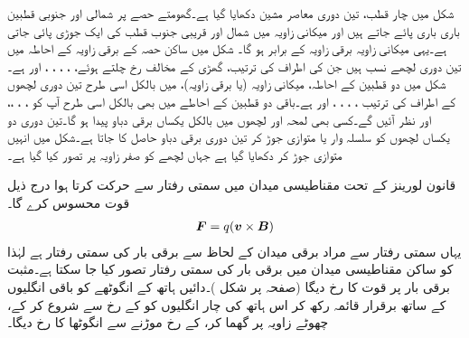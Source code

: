 شکل  میں چار قطب، تین دوری معاصر مشین دکھایا گیا ہے۔گھومتے حصے پر شمالی اور جنوبی قطبین باری باری پائے جاتے ہیں اور  میکانی زاویہ میں شمال اور قریبی جنوب قطب کی ایک  جوڑی  پائی جاتی ہے۔یہی میکانی زاویہ   برقی زاویہ کے برابر ہو گا۔ شکل  میں ساکن حصہ کے  برقی زاویہ کے احاطہ میں تین دوری لچھے نسب  ہیں  جن کی اطراف کی ترتیب، گھڑی کے مخالف رخ چلتے ہوئے،   ، ، ، ،  اور  ہے۔شکل  میں  دو قطبین کے احاطہ،  میکانی زاویہ (یا  برقی زاویہ)، میں بالکل اسی طرح تین دوری لچھوں کے اطراف کی ترتیب   ، ، ، ،  اور  ہے۔باقی دو قطبین کے احاطے میں بھی بالکل اسی طرح آپ کو ، ، ،،  اور  نظر آئیں گے۔کسی بھی لمحہ  اور  لچھوں میں بالکل یکساں برقی دباو پیدا ہو گا۔تین  دوری دو یکساں لچھوں کو سلسلہ وار یا متوازی جوڑ کر تین دوری برقی دباو حاصل کا جاتا ہے۔شکل  میں انہیں متوازی جوڑ کر دکھایا گیا ہے جہاں  لچھے کو صفر زاویہ پر تصور کیا گیا ہے۔    

قانون لورینز کے تحت مقناطیسی میدان  میں سمتی رفتار  سے حرکت کرتا ہوا        درج ذیل قوت   محسوس کرے گا۔
\begin{align}\label{مساوات_گھومتے_مشین_قوت_لورینز}
{\ensuremath{{\boldsymbol{F}}}}=q ({{\boldsymbol{v}}} \times {\ensuremath{{\boldsymbol{B}}}})
\end{align}
یہاں سمتی رفتار سے مراد برقی میدان کے لحاظ سے برقی بار کی سمتی رفتار ہے لہٰذا  کو ساکن مقناطیسی میدان میں برقی بار کی سمتی رفتار تصور کیا جا سکتا ہے۔مثبت برقی بار پر  قوت کا رخ   دیگا (صفحہ  پر شکل )۔دائیں ہاتھ کے انگوٹھے  کو باقی انگلیوں کے ساتھ برقرار قائمہ رکھ کر اس ہاتھ کی چار انگلیوں کو  کے رخ سے شروع کر کے، چھوٹے زاویہ پر گھما کر،   کے رخ  موڑنے سے انگوٹھا  کا رخ دیگا۔

